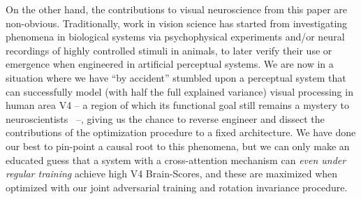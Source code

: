 \documentclass{article} %
\begin{document}
On the other hand, the contributions to visual neuroscience from this paper are non-obvious. Traditionally, work in vision science has started from investigating phenomena in biological systems via psychophysical experiments and/or neural recordings of highly controlled stimuli in animals, to later verify their use or emergence when engineered in artificial perceptual systems. We are now in a situation where we have ``by accident'' stumbled upon a perceptual system that can successfully model (with half the full explained variance) visual processing in human area V4 -- a region of which its functional goal still remains a mystery to neuroscientists~\citep{vacher2020texture,bashivan2019neural} --, giving us the chance to reverse engineer and dissect the contributions of the optimization procedure to a fixed architecture. We have done our best to pin-point a causal root to this phenomena, but we can only make an educated guess that a system with a cross-attention mechanism can \textit{even under regular training} achieve high V4 Brain-Scores, and these are maximized when optimized with our joint adversarial training and rotation invariance procedure.
\end{document}
